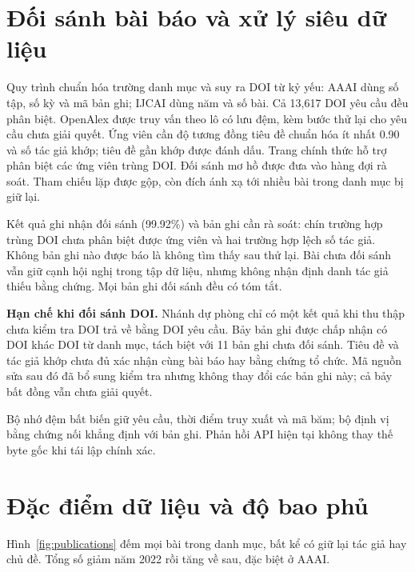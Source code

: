 \section{Đối sánh bài báo và xử lý siêu dữ liệu}
Quy trình chuẩn hóa trường danh mục và suy ra DOI từ kỷ yếu: AAAI dùng số tập,
số kỳ và mã bản ghi; IJCAI dùng năm và số bài. Cả 13,617 DOI yêu cầu đều phân
biệt. OpenAlex được truy vấn theo lô có lưu đệm, kèm bước thử lại cho yêu cầu
chưa giải quyết. Ứng viên cần độ tương đồng tiêu đề chuẩn hóa ít nhất 0.90 và
số tác giả khớp; tiêu đề gần khớp được đánh dấu. Trang chính thức hỗ trợ phân
biệt các ứng viên trùng DOI. Đối sánh mơ hồ được đưa vào hàng đợi rà soát.
Tham chiếu lặp được gộp, còn đích ánh xạ tới nhiều bài trong danh mục bị giữ lại.

Kết quả ghi nhận \MatchedWorks{} đối sánh (99.92\%) và \UnmatchedWorks{} bản
ghi cần rà soát: chín trường hợp trùng DOI chưa phân biệt được ứng viên và hai
trường hợp lệch số tác giả. Không bản ghi nào được báo là không tìm thấy sau
thử lại. Bài chưa đối sánh vẫn giữ cạnh hội nghị trong tập dữ liệu, nhưng
không nhận định danh tác giả thiếu bằng chứng. Mọi bản ghi đối sánh đều có tóm tắt.

\textbf{Hạn chế khi đối sánh DOI.} Nhánh dự phòng chỉ có một kết quả khi thu
thập chưa kiểm tra DOI trả về bằng DOI yêu cầu. Bảy bản ghi được chấp nhận có
DOI khác DOI từ danh mục, tách biệt với 11 bản ghi chưa đối sánh. Tiêu đề và
tác giả khớp chưa đủ xác nhận cùng bài báo hay bằng chứng tổ chức. Mã nguồn
sửa sau đó đã bổ sung kiểm tra nhưng không thay đổi các bản ghi này; cả bảy
bất đồng vẫn chưa giải quyết.

Bộ nhớ đệm bất biến giữ yêu cầu, thời điểm truy xuất và mã băm; bộ định vị bằng
chứng nối khẳng định với bản ghi. Phản hồi API hiện tại không thay thế byte gốc
khi tái lập chính xác.

\section{Đặc điểm dữ liệu và độ bao phủ}
Hình~\ref{fig:publications} đếm mọi bài trong danh mục, bất kể có giữ lại tác
giả hay chủ đề. Tổng số giảm năm 2022 rồi tăng về sau, đặc biệt ở AAAI.


